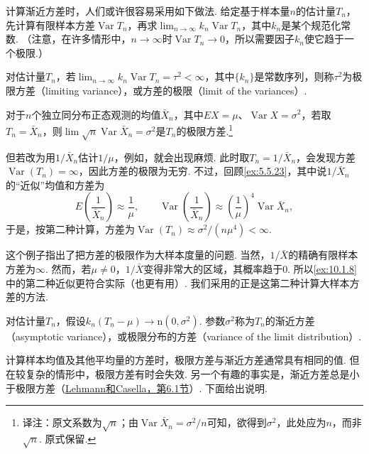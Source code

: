 计算渐近方差时，人们或许很容易采用如下做法. 给定基于样本量$n$的估计量$T_n$，先计算有限样本方差$\operatorname{Var}T_n$，再求$\lim_{n\to\infty}k_n\operatorname{Var}T_n$，其中$k_n$是某个规范化常数. （注意，在许多情形中，$n\to\infty$时$\operatorname{Var}T_n\to0$，所以需要因子$k_n$使它趋于一个极限.）

\begin{definition}\label{def:10.1.7}
对估计量$T_n$，若$\lim_{n\to\infty}k_n\operatorname{Var}T_n=\tau^2<\infty$，其中$\{k_n\}$是常数序列，则称$\tau^2$为极限方差（limiting variance），或方差的极限（limit of the variances）.
\end{definition}

\begin{example}[极限方差]\label{ex:10.1.8}
对于$n$个独立同分布正态观测的均值$\bar X_n$，其中$EX=\mu$、$\operatorname{Var}X=\sigma^2$，若取$T_n=\bar X_n$，则$\lim\sqrt n\operatorname{Var}\bar X_n=\sigma^2$是$T_n$的极限方差.\footnote{译注：原文系数为$\sqrt n$；由$\operatorname{Var}\bar X_n=\sigma^2/n$可知，欲得到$\sigma^2$，此处应为$n$，而非$\sqrt n$. 原式保留.}

但若改为用$1/\bar X_n$估计$1/\mu$，例如，就会出现麻烦. 此时取$T_n=1/\bar X_n$，会发现方差$\operatorname{Var}(T_n)=\infty$，因此方差的极限为无穷. 不过，回顾\autoref{ex:5.5.23}，其中说$1/\bar X_n$的“近似”均值和方差为
$$E\left(\frac1{\bar X_n}\right)\approx\frac1\mu,\qquad
\operatorname{Var}\left(\frac1{\bar X_n}\right)\approx\left(\frac1\mu\right)^4\operatorname{Var}\bar X_n,$$
于是，按第二种计算，方差为$\operatorname{Var}(T_n)\approx\sigma^2/(n\mu^4)<\infty$.
\end{example}

这个例子指出了把方差的极限作为大样本度量的问题. 当然，$1/\bar X$的精确有限样本方差为$\infty$. 然而，若$\mu\ne0$，$1/\bar X$变得非常大的区域，其概率趋于0. 所以\autoref{ex:10.1.8}中的第二种近似更符合实际（也更有用）. 我们采用的正是这第二种计算大样本方差的方法.

\begin{definition}\label{def:10.1.9}
对估计量$T_n$，假设$k_n(T_n-\mu)\to\mathrm n(0,\sigma^2)$. 参数$\sigma^2$称为$T_n$的渐近方差（asymptotic variance），或极限分布的方差（variance of the limit distribution）.
\end{definition}

计算样本均值及其他平均量的方差时，极限方差与渐近方差通常具有相同的值. 但在较复杂的情形中，极限方差有时会失效. 另一个有趣的事实是，渐近方差总是小于极限方差（\hyperref[bib:source200]{Lehmann和Casella，第6.1节}）. 下面给出说明.

